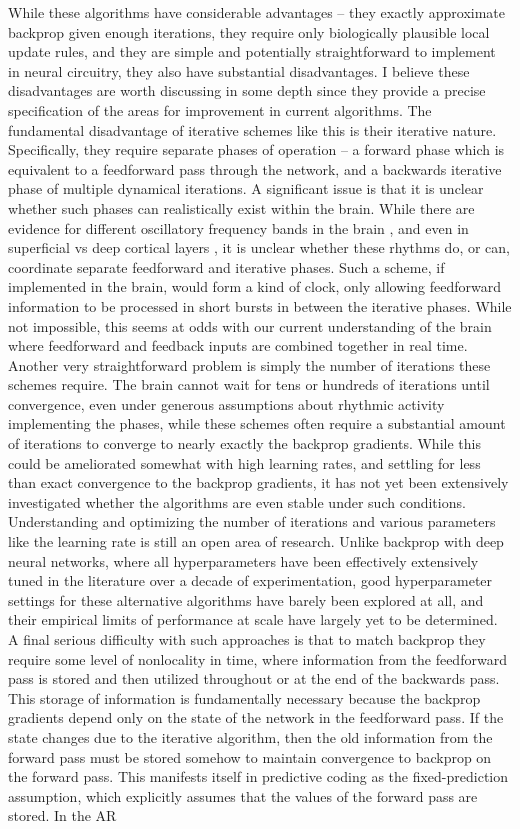 While these algorithms have considerable advantages -- they exactly approximate backprop given enough iterations, they require only biologically plausible local update rules, and they are simple and potentially straightforward to implement in neural circuitry, they also have substantial disadvantages. I believe these disadvantages are worth discussing in some depth since they provide a precise specification of the areas for improvement in current algorithms. The fundamental disadvantage of iterative schemes like this is their iterative nature. Specifically, they require separate phases of operation -- a forward phase which is equivalent to a feedforward pass through the network, and a backwards iterative phase of multiple dynamical iterations. A significant issue is that it is unclear whether such phases can realistically exist within the brain. While there are evidence for different oscillatory frequency bands in the brain \citep{buzsaki2006rhythms}, and even in superficial vs deep cortical layers \citep{bastos2020layer,bastos2015visual}, it is unclear whether these rhythms do, or can, coordinate separate feedforward and iterative phases. Such a scheme, if implemented in the brain, would form a kind of clock, only allowing feedforward information to be processed in short bursts in between the iterative phases. While not impossible, this seems at odds with our current understanding of the brain where feedforward and feedback inputs are combined together in real time. Another very straightforward problem is simply the number of iterations these schemes require. The brain cannot wait for tens or hundreds of iterations until convergence, even under generous assumptions about rhythmic activity implementing the phases, while these schemes often require a substantial amount of iterations to converge to nearly exactly the backprop gradients. While this could be ameliorated somewhat with high learning rates, and settling for less than exact convergence to the backprop gradients, it has not yet been extensively investigated whether the algorithms are even stable under such conditions. Understanding and optimizing the number of iterations and various parameters like the learning rate is still an open area of research. Unlike backprop with deep neural networks, where all hyperparameters have been effectively extensively tuned in the literature over a decade of experimentation, good hyperparameter settings for these alternative algorithms have barely been explored at all, and their empirical limits of performance at scale have largely yet to be determined. A final serious difficulty with such approaches is that to match backprop they require some level of nonlocality in time, where information from the feedforward pass is stored and then utilized throughout or at the end of the backwards pass. This storage of information is fundamentally necessary because the backprop gradients depend only on the state of the network in the feedforward pass. If the state changes due to the iterative algorithm, then the old information from the forward pass must be stored somehow to maintain convergence to backprop on the forward pass. This manifests itself in predictive coding as the fixed-prediction assumption, which explicitly assumes that the values of the forward pass are stored. In the AR 